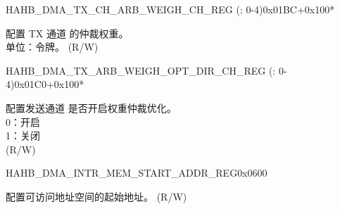 \begin{register}{H}{AHB\_DMA\_TX\_CH\_ARB\_WEIGH\_CH\_REG (: 0-4)}{0x01BC+0x100*}\label{regdesc:AHBDMATXCHARBWEIGHCHNREG}
%
%
\regnewline%
\begin{regdesc}\begin{reglist}
\label{fielddesc:AHBDMATXCHARBWEIGHCHN}\item [AHB\_DMA\_TX\_CH\_ARB\_WEIGH\_CH\regindex{n}] 配置 TX 通道  的仲裁权重。\\单位：令牌。 (R/W)
\end{reglist}\end{regdesc}
\end{register}


\begin{register}{H}{AHB\_DMA\_TX\_ARB\_WEIGH\_OPT\_DIR\_CH\_REG (: 0-4)}{0x01C0+0x100*}\label{regdesc:AHBDMATXARBWEIGHOPTDIRCHNREG}
%
%
\regnewline%
\begin{regdesc}\begin{reglist}
\label{fielddesc:AHBDMATXARBWEIGHOPTDIRCHN}\item [AHB\_DMA\_TX\_ARB\_WEIGH\_OPT\_DIR\_CH\regindex{n}] 配置发送通道  是否开启权重仲裁优化。\\
0：开启\\
1：关闭\\ (R/W)
\end{reglist}\end{regdesc}
\end{register}


\begin{register}{H}{AHB\_DMA\_INTR\_MEM\_START\_ADDR\_REG}{0x0600}\label{regdesc:AHBDMAINTRMEMSTARTADDRREG}
%
\regnewline%
\begin{regdesc}\begin{reglist}
\label{fielddesc:AHBDMAACCESSINTRMEMSTARTADDR}\item [AHB\_DMA\_ACCESS\_INTR\_MEM\_START\_ADDR] 配置可访问地址空间的起始地址。 (R/W)
\end{reglist}\end{regdesc}
\end{register}


